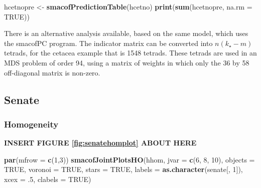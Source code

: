 \documentclass[
  12pt,
]{article}
\newenvironment{Shaded}{\begin{snugshade}}{\end{snugshade}}
\newcommand{\AttributeTok}[1]{\textcolor[rgb]{0.13,0.29,0.53}{#1}}
\newcommand{\ConstantTok}[1]{\textcolor[rgb]{0.56,0.35,0.01}{#1}}
\newcommand{\DecValTok}[1]{\textcolor[rgb]{0.00,0.00,0.81}{#1}}
\newcommand{\FunctionTok}[1]{\textcolor[rgb]{0.13,0.29,0.53}{\textbf{#1}}}
\newcommand{\NormalTok}[1]{#1}
\newcommand{\OtherTok}[1]{\textcolor[rgb]{0.56,0.35,0.01}{#1}}
\begin{document}
\begin{Shaded}
\begin{Highlighting}[]
\NormalTok{hcetnopre }\OtherTok{\textless{}{-}} \FunctionTok{smacofPredictionTable}\NormalTok{(hcetno)}
\FunctionTok{print}\NormalTok{(}\FunctionTok{sum}\NormalTok{(hcetnopre, }\AttributeTok{na.rm =} \ConstantTok{TRUE}\NormalTok{))}
\end{Highlighting}
\end{Shaded}

There is an alternative analysis available, based on the same model, which uses the smacofPC program. The indicator matrix can be
converted into \(n(k_\star-m)\) tetrads, for the cetacea example
that is 1548 tetrads. These tetrads are used in
an MDS problem of order 94, using a matrix of weights
in which only the 36 by 58 off-diagonal matrix is non-zero.

\subsection{Senate}\label{senate}

\subsubsection{Homogeneity}\label{homogeneity-2}

\begin{greybox}

\begin{center}
\textbf{INSERT FIGURE \ref{fig:senatehomplot} ABOUT HERE}

\end{center}

\end{greybox}

\begin{Shaded}
\begin{Highlighting}[]
\FunctionTok{par}\NormalTok{(}\AttributeTok{mfrow =} \FunctionTok{c}\NormalTok{(}\DecValTok{1}\NormalTok{,}\DecValTok{3}\NormalTok{))}
\FunctionTok{smacofJointPlotsHO}\NormalTok{(hhom, }\AttributeTok{jvar =} \FunctionTok{c}\NormalTok{(}\DecValTok{6}\NormalTok{, }\DecValTok{8}\NormalTok{, }\DecValTok{10}\NormalTok{), }\AttributeTok{objects =} \ConstantTok{TRUE}\NormalTok{, }\AttributeTok{voronoi =} \ConstantTok{TRUE}\NormalTok{, }\AttributeTok{stars =} \ConstantTok{TRUE}\NormalTok{, }\AttributeTok{labels =} \FunctionTok{as.character}\NormalTok{(senate[, }\DecValTok{1}\NormalTok{]), }\AttributeTok{xcex =}\NormalTok{ .}\DecValTok{5}\NormalTok{, }\AttributeTok{clabels =} \ConstantTok{TRUE}\NormalTok{)}
\end{Highlighting}
\end{Shaded}
\end{document}
